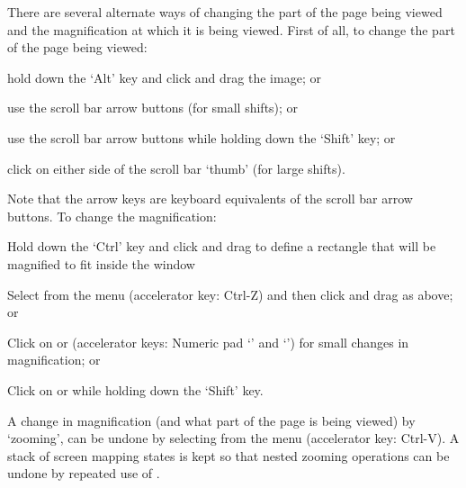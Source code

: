 There are several alternate ways of changing the part of the page
being viewed and the magnification at which it is being viewed.
%
First of all, to change the part of the page being viewed:

\beginbullets

\bpar hold down the `Alt' key and click and drag the image; or

\bpar use the scroll bar arrow buttons (for small shifts); or

\bpar use the scroll bar arrow buttons while holding down the `Shift' key; or

\bpar click on either side of the scroll bar `thumb' (for large shifts).

\endbullets

\noindent
Note that 
the arrow keys are keyboard equivalents of the scroll bar arrow buttons.
To change the magnification:

\beginbullets

\bpar Hold down the `Ctrl' key and click and drag to define a rectangle
that will be magnified to fit inside the window%


\bpar Select  from the  menu (accelerator key:
Ctrl-Z)  and then click and drag as above; or

\bpar Click on  or  
(accelerator keys: Numeric pad `\type{+}' and `\type{-}') 
for small changes in magnification; or

\bpar Click on  or  
while holding down the `Shift' key.

\endbullets

\noindent
A change in magnification (and what part of the page %
is being viewed) by %
`zooming', can be undone by selecting 
 from the  menu (accelerator key: Ctrl-V).  
A stack of screen mapping states is kept so that nested zooming
operations can be undone by repeated use of .


